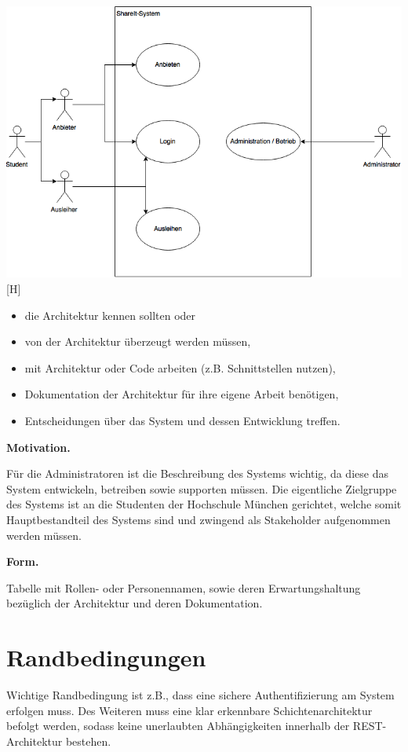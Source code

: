 \documentclass[]{article}
\begin{document}
\includegraphics{images/UseCaseDiagram.png}[H]
\begin{itemize}
\item
  die Architektur kennen sollten oder
\item
  von der Architektur überzeugt werden müssen,
\item
  mit Architektur oder Code arbeiten (z.B. Schnittstellen nutzen),
\item
  Dokumentation der Architektur für ihre eigene Arbeit benötigen,
\item
  Entscheidungen über das System und dessen Entwicklung treffen.
\end{itemize}

\textbf{Motivation.}

Für die Administratoren ist die Beschreibung des Systems wichtig, da diese das System entwickeln, betreiben sowie supporten müssen.
Die eigentliche Zielgruppe des Systems ist an die Studenten der Hochschule München gerichtet, welche somit Hauptbestandteil des Systems sind und zwingend als Stakeholder aufgenommen werden müssen.

\textbf{Form.}

Tabelle mit Rollen- oder Personennamen, sowie deren Erwartungshaltung
bezüglich der Architektur und deren Dokumentation.


\section{Randbedingungen}\label{section-architecture-constraints}

Wichtige Randbedingung ist z.B., dass eine sichere Authentifizierung am System erfolgen muss. Des Weiteren muss eine klar erkennbare Schichtenarchitektur befolgt werden, sodass keine unerlaubten Abhängigkeiten innerhalb der REST-Architektur bestehen.
\end{document}
